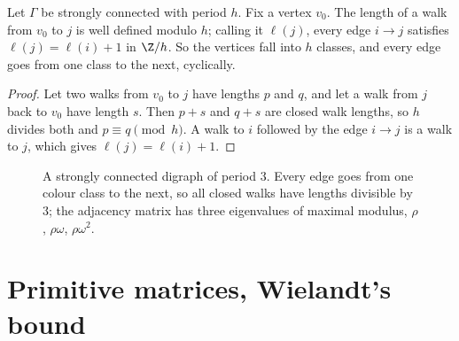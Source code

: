 \begin{proposition}\label{linear:prop:levels}
Let $\Gamma$ be strongly connected with period $h$. Fix a vertex $v_0$. The length of a walk from $v_0$ to $j$ is
well defined modulo $h$; calling it $\ell(j)$, every edge $i\to j$ satisfies $\ell(j)=\ell(i)+1$ in $\Z/h$. So the vertices
fall into $h$ classes, and every edge goes from one class to the next, cyclically.
\end{proposition}
\begin{proof}
Let two walks from $v_0$ to $j$ have lengths $p$ and $q$, and let a walk from $j$ back to $v_0$ have length $s$. Then $p+s$ and
$q+s$ are closed walk lengths, so $h$ divides both and $p\equiv q\pmod h$. A walk to $i$ followed by the edge $i\to j$ is a walk
to $j$, which gives $\ell(j)=\ell(i)+1$.
\end{proof}

\begin{figure}[ht]
\centering
{}
\caption{A strongly connected digraph of period $3$. Every edge goes from one colour class to the next, so all closed walks
have lengths divisible by $3$; the adjacency matrix has three eigenvalues of maximal modulus, $\rho$, $\rho\omega$, $\rho\omega^2$.}
\label{linear:fig:period}
\end{figure}

\section{Primitive matrices, Wielandt's bound}

